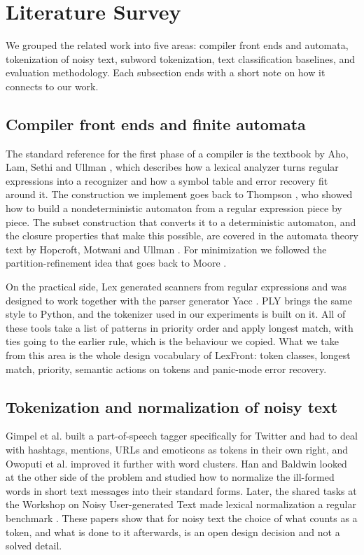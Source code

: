 \documentclass[journal,a4paper]{IEEEtran}
\begin{document}
\section{Literature Survey}\label{sec:2}
We grouped the related work into five areas: compiler front ends and automata, tokenization of noisy text, subword tokenization, text classification baselines, and evaluation methodology. Each subsection ends with a short note on how it connects to our work.

\subsection{Compiler front ends and finite automata}\label{sec:2.1}
The standard reference for the first phase of a compiler is the textbook by Aho, Lam, Sethi and Ullman \cite{r1}, which describes how a lexical analyzer turns regular expressions into a recognizer and how a symbol table and error recovery fit around it. The construction we implement goes back to Thompson \cite{r5}, who showed how to build a nondeterministic automaton from a regular expression piece by piece. The subset construction that converts it to a deterministic automaton, and the closure properties that make this possible, are covered in the automata theory text by Hopcroft, Motwani and Ullman \cite{r6}. For minimization we followed the partition-refinement idea that goes back to Moore \cite{r7}.

On the practical side, Lex \cite{r8} generated scanners from regular expressions and was designed to work together with the parser generator Yacc \cite{r9}. PLY \cite{r10} brings the same style to Python, and the tokenizer used in our experiments is built on it. All of these tools take a list of patterns in priority order and apply longest match, with ties going to the earlier rule, which is the behaviour we copied. What we take from this area is the whole design vocabulary of LexFront: token classes, longest match, priority, semantic actions on tokens and panic-mode error recovery.

\subsection{Tokenization and normalization of noisy text}\label{sec:2.2}
Gimpel et al. \cite{r2} built a part-of-speech tagger specifically for Twitter and had to deal with hashtags, mentions, URLs and emoticons as tokens in their own right, and Owoputi et al. \cite{r11} improved it further with word clusters. Han and Baldwin \cite{r3} looked at the other side of the problem and studied how to normalize the ill-formed words in short text messages into their standard forms. Later, the shared tasks at the Workshop on Noisy User-generated Text made lexical normalization a regular benchmark \cite{r12}. These papers show that for noisy text the choice of what counts as a token, and what is done to it afterwards, is an open design decision and not a solved detail.
\end{document}
